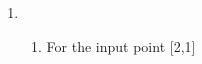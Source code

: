 \documentclass{article}
\begin{document}
    \begin{enumerate}
        \item \begin{enumerate}[label=(\alph*)]
            \item For the input point [2,1]
        \end{enumerate}
    \end{enumerate}
\end{document}
